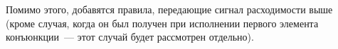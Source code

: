       
    Помимо этого, добавятся правила, передающие сигнал расходимости выше (кроме случая, когда он был получен при исполнении первого элемента конъюнкции~--- этот случай будет рассмотрен отдельно). %
    
          
    
    
